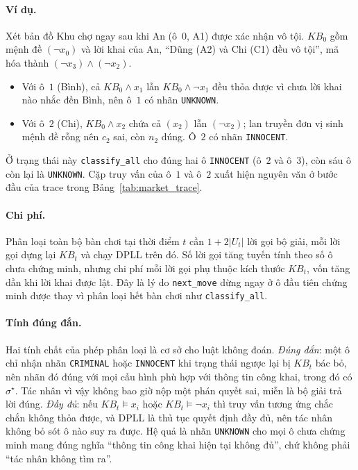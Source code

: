 \begin{sloppypar}
\paragraph{Ví dụ.}
Xét bản đồ Khu chợ ngay sau khi An (ô~$0$, A1) được xác nhận vô tội.
$\mathit{KB}_0$ gồm mệnh đề $(\neg x_0)$ và lời khai của An, ``Dũng (A2) và Chi
(C1) đều vô tội'', mã hóa thành $(\neg x_3) \land (\neg x_2)$.
\begin{itemize}
  \item Với ô~$1$ (Bình), cả $\mathit{KB}_0 \land x_1$ lẫn
    $\mathit{KB}_0 \land \neg x_1$ đều thỏa được vì chưa lời khai nào nhắc đến
    Bình, nên ô~$1$ có nhãn \texttt{UNKNOWN}.
  \item Với ô~$2$ (Chi), $\mathit{KB}_0 \land x_2$ chứa cả $(x_2)$ lẫn
    $(\neg x_2)$; lan truyền đơn vị sinh mệnh đề rỗng nên $c_2$ sai, còn $n_2$
    đúng. Ô~$2$ có nhãn \texttt{INNOCENT}.
\end{itemize}
Ở trạng thái này \texttt{classify\_all} cho đúng hai ô \texttt{INNOCENT} (ô~$2$
và ô~$3$), còn sáu ô còn lại là \texttt{UNKNOWN}. Cặp truy vấn của ô~$1$ và ô~$2$
xuất hiện nguyên văn ở bước đầu của trace trong
Bảng~\ref{tab:market_trace}.

\paragraph{Chi phí.}
Phân loại toàn bộ bàn chơi tại thời điểm $t$ cần $1 + 2|U_t|$ lời gọi bộ giải,
mỗi lời gọi dựng lại $\mathit{KB}_t$ và chạy DPLL trên đó. Số lời gọi tăng tuyến
tính theo số ô chưa chứng minh, nhưng chi phí mỗi lời gọi phụ thuộc kích thước
$\mathit{KB}_t$, vốn tăng dần khi lời khai được lật. Đây là lý do
\texttt{next\_move} dừng ngay ở ô đầu tiên chứng minh được thay vì phân loại hết
bàn chơi như \texttt{classify\_all}.

\paragraph{Tính đúng đắn.}
Hai tính chất của phép phân loại là cơ sở cho luật không đoán.
\emph{Đúng đắn}: một ô chỉ nhận nhãn \texttt{CRIMINAL} hoặc \texttt{INNOCENT}
khi trạng thái ngược lại bị $\mathit{KB}_t$ bác bỏ, nên nhãn đó đúng với mọi
cấu hình phù hợp với thông tin công khai, trong đó có $\sigma^\star$. Tác nhân
vì vậy không bao giờ nộp một phán quyết sai, miễn là bộ giải trả lời đúng.
\emph{Đầy đủ}: nếu $\mathit{KB}_t \models x_i$ hoặc
$\mathit{KB}_t \models \neg x_i$ thì truy vấn tương ứng chắc chắn không thỏa
được, và DPLL là thủ tục quyết định đầy đủ, nên tác nhân không bỏ sót ô nào
suy ra được. Hệ quả là nhãn \texttt{UNKNOWN} cho mọi ô chưa chứng minh mang
đúng nghĩa ``thông tin công khai hiện tại không đủ'', chứ không phải ``tác nhân
không tìm ra''.
\end{sloppypar}
